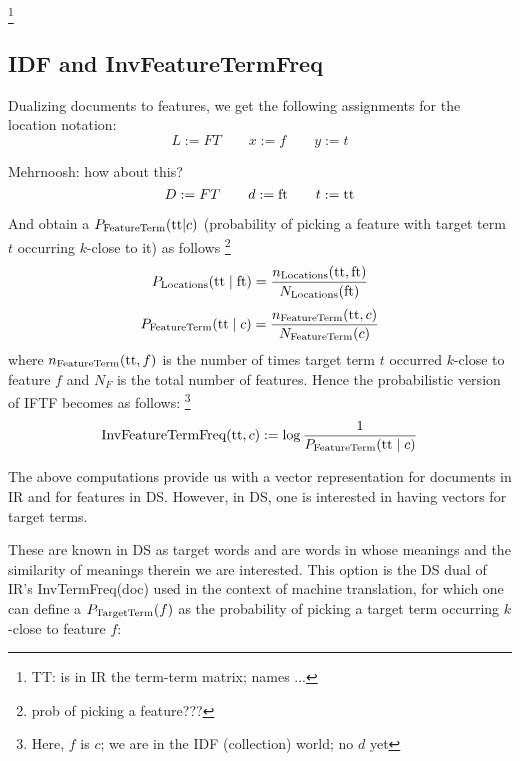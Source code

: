 \footnote{TT: is in IR the term-term matrix; names ...}

\hrulefill

\subsection{IDF and InvFeatureTermFreq}

Dualizing documents to features,
we get the following assignments for the location notation:
\[
L := FT \qquad
x := f\qquad
y := t
\]

\newcommand{\featureterm}{\textmd{ft}}
\newcommand{\targetterm}{\textmd{tt}}
\hrulefill Mehrnoosh: how about this?
\[
D := FT \qquad
d := \featureterm\qquad
t := \targetterm
\]

And obtain a $P_{\textmd{FeatureTerm}}(\targetterm|c)$ (probability of picking a feature with target term $t$ occurring $k$-close to it) as follows
\footnote{prob of picking a feature???}
\[
P_{\textmd{Locations}}(\targetterm \mid \featureterm) = \frac{n_{\textmd{Locations}}(\targetterm,\featureterm)}{N_{\textmd{Locations}} (\featureterm)} 
\]
\begin{equation}
P_{\textmd{FeatureTerm}}(\targetterm \mid c) = \frac{n_{\textmd{FeatureTerm}}(\targetterm,c)}{N_{\textmd{FeatureTerm}} (c)} 
\end{equation}
where $n_{\textmd{FeatureTerm}}(\targetterm,f)$ is the number of times target term $t$ occurred $k$-close to feature $f$ and $N_F$ is the total number of features. Hence the probabilistic version of IFTF becomes as follows:
\footnote{Here, $f$ is $c$; we are in the IDF (collection) world; no $d$ yet}
\begin{equation}
\label{eqn:iftf}
\textmd{InvFeatureTermFreq}(\targetterm, c) :=
	\log{\frac{1}{P_{\textmd{FeatureTerm}}(\targetterm \mid c)}}
\end{equation}

\medskip
The above computations provide us with a vector representation for documents in IR and for features in DS. However, in DS, one is interested in having vectors for target terms.

These are known in DS as target words and  are words in whose meanings and the similarity of meanings therein we are interested.
This option is the DS dual of IR's  InvTermFreq(doc) used in the context of machine translation, for which one can define a $P_{\textmd{TargetTerm}}(f) $ as the  probability of picking a target term  occurring $k$-close to feature $f$: 

